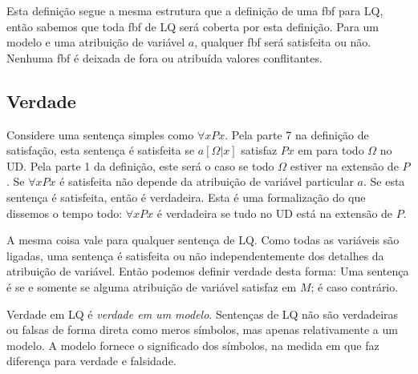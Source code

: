Esta definição segue a mesma estrutura que a definição de uma fbf para LQ, então sabemos que toda fbf de LQ será coberta por esta definição. Para um modelo  e uma atribuição de variável $a$, qualquer fbf será satisfeita ou não. Nenhuma fbf é deixada de fora ou atribuída valores conflitantes.

\subsection{Verdade}

Considere uma sentença simples como $\forall xPx$. Pela parte 7 na definição de satisfação, esta sentença é satisfeita se $a[\Omega|x]$ satisfaz $Px$ em  para todo $\Omega$ no UD. Pela parte 1 da definição, este será o caso se todo $\Omega$ estiver na extensão de $P$. Se $\forall xPx$ é satisfeita não depende da atribuição de variável particular $a$. Se esta sentença é satisfeita, então é verdadeira. Esta é uma formalização do que dissemos o tempo todo: $\forall xPx$ é verdadeira se tudo no UD está na extensão de $P$.

A mesma coisa vale para qualquer sentença de LQ. Como todas as variáveis são ligadas, uma sentença é satisfeita ou não independentemente dos detalhes da atribuição de variável. Então podemos definir verdade desta forma: Uma sentença  é   se e somente se alguma atribuição de variável satisfaz  em $M$;  é   caso contrário.

Verdade em LQ é \emph{verdade em um modelo}. Sentenças de LQ não são verdadeiras ou falsas de forma direta como meros símbolos, mas apenas relativamente a um modelo. A modelo fornece o significado dos símbolos, na medida em que faz diferença para verdade e falsidade.

